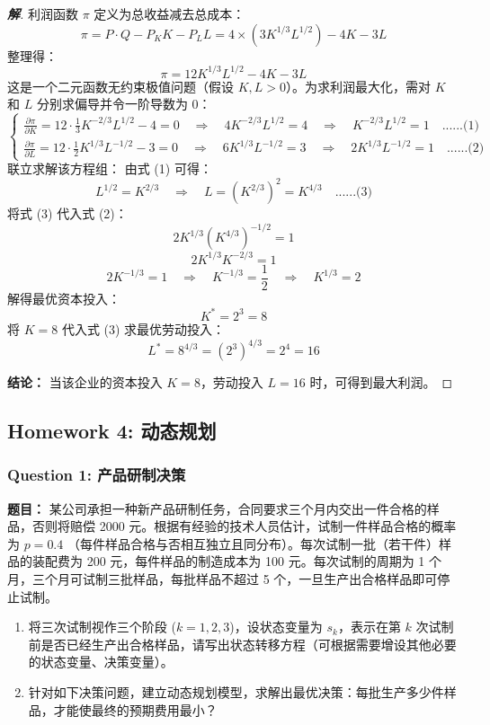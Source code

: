 \documentclass[a4paper,12pt]{ctexart} %
\newenvironment{solution}{\begin{proof}[\textbf{解}]}{\end{proof}}
\begin{document}
	\begin{solution}
		利润函数 $\pi$ 定义为总收益减去总成本：
		\[ \pi = P \cdot Q - P_K K - P_L L = 4 \times (3K^{1/3}L^{1/2}) - 4K - 3L \]
		整理得：
		\[ \pi = 12K^{1/3}L^{1/2} - 4K - 3L \]
		这是一个二元函数无约束极值问题（假设 $K,L > 0$）。为求利润最大化，需对 $K$ 和 $L$ 分别求偏导并令一阶导数为 0：
		\[
		\begin{cases}
			\frac{\partial \pi}{\partial K} = 12 \cdot \frac{1}{3} K^{-2/3} L^{1/2} - 4 = 0 \quad \Rightarrow \quad 4K^{-2/3} L^{1/2} = 4 \quad \Rightarrow \quad K^{-2/3} L^{1/2} = 1 \quad \text{......(1)} \\
			\frac{\partial \pi}{\partial L} = 12 \cdot \frac{1}{2} K^{1/3} L^{-1/2} - 3 = 0 \quad \Rightarrow \quad 6K^{1/3} L^{-1/2} = 3 \quad \Rightarrow \quad 2 K^{1/3} L^{-1/2} = 1 \quad \text{......(2)}
		\end{cases}
		\]
		联立求解该方程组：
		由式 (1) 可得：
		\[ L^{1/2} = K^{2/3} \quad \Rightarrow \quad L = (K^{2/3})^2 = K^{4/3} \quad \text{......(3)} \]
		将式 (3) 代入式 (2)：
		\[ 2 K^{1/3} (K^{4/3})^{-1/2} = 1 \]
		\[ 2 K^{1/3} K^{-2/3} = 1 \]
		\[ 2 K^{-1/3} = 1 \quad \Rightarrow \quad K^{-1/3} = \frac{1}{2} \quad \Rightarrow \quad K^{1/3} = 2 \]
		解得最优资本投入：
		\[ K^* = 2^3 = 8 \]
		将 $K=8$ 代入式 (3) 求最优劳动投入：
		\[ L^* = 8^{4/3} = (2^3)^{4/3} = 2^4 = 16 \]
		
		\textbf{结论：} 当该企业的资本投入 $K=8$，劳动投入 $L=16$ 时，可得到最大利润。
	\end{solution}
	
	\subsection{Homework 4: 动态规划}
	
	\subsubsection*{Question 1: 产品研制决策}
	\textbf{题目：} 某公司承担一种新产品研制任务，合同要求三个月内交出一件合格的样品，否则将赔偿 2000 元。根据有经验的技术人员估计，试制一件样品合格的概率为 $p=0.4$ （每件样品合格与否相互独立且同分布）。每次试制一批（若干件）样品的装配费为 200 元，每件样品的制造成本为 100 元。每次试制的周期为 1 个月，三个月可试制三批样品，每批样品不超过 5 个，一旦生产出合格样品即可停止试制。
	
	\begin{enumerate}
		\item 将三次试制视作三个阶段 ($k=1, 2, 3$)，设状态变量为 $s_k$，表示在第 $k$ 次试制前是否已经生产出合格样品，请写出状态转移方程（可根据需要增设其他必要的状态变量、决策变量）。
		
		\item 针对如下决策问题，建立动态规划模型，求解出最优决策：每批生产多少件样品，才能使最终的预期费用最小？
	\end{enumerate}
	
\end{document}

